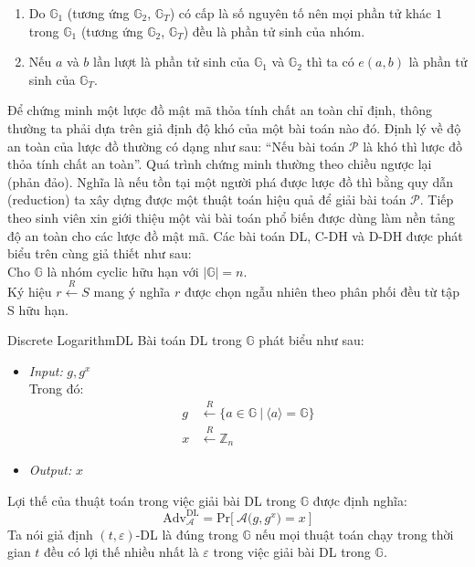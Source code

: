 \documentclass[class=report, crop=false]{standalone}
\begin{document}
		\begin{remark}
			\leavevmode \vspace{-\baselineskip}
			\begin{enumerate}[label=(\roman*), leftmargin=1cm]
				\item Do $\mathbb{G}_1$ (tương ứng $\mathbb{G}_2$, $\mathbb{G}_T$) có cấp là số nguyên tố nên mọi phần tử khác $1$ trong $\mathbb{G}_1$ (tương ứng $\mathbb{G}_2$, $\mathbb{G}_T$) đều là phần tử sinh của nhóm.
				\item Nếu $a$ và $b$ lần lượt là phần tử sinh của $\mathbb{G}_1$ và $\mathbb{G}_2$ thì ta có $e(a, b)$ là phần tử sinh của $\mathbb{G}_T$.
			\end{enumerate}
		\end{remark}
		Để chứng minh một lược đồ mật mã thỏa tính chất an toàn chỉ định, thông thường ta phải dựa trên giả định độ khó của một bài toán nào đó. Định lý về độ an toàn của lược đồ thường có dạng như sau: ``Nếu bài toán $\mathcal{P}$ là khó thì lược đồ thỏa tính chất an toàn''. Quá trình chứng minh thường theo chiều ngược lại (phản đảo). Nghĩa là nếu tồn tại một người phá được lược đồ thì bằng quy dẫn (reduction) ta xây dựng được một thuật toán hiệu quả để giải bài toán $\mathcal{P}$.
		\newpage
		Tiếp theo sinh viên xin giới thiệu một vài bài toán phổ biến được dùng làm nền tảng độ an toàn cho các lược đồ mật mã. Các bài toán DL, C-DH và D-DH được phát biểu trên cùng giả thiết như sau: \\ \indent
		Cho $\mathbb{G}$ là nhóm cyclic hữu hạn với $|\mathbb{G}| = n$. \\ \indent
		Ký hiệu \hspace{1ex} $r \xleftarrow{R} S$ \hspace{1ex} mang ý nghĩa $r$ được chọn ngẫu nhiên theo phân phối đều từ tập S hữu hạn.
		\begin{problem}{Discrete Logarithm}{DL}
			Bài toán DL trong $\mathbb{G}$ phát biểu như sau:
			\vspace{-\baselineskip}
			\begin{itemize}[leftmargin=1.5cm, itemindent=-0.5cm]
				\item[] \textit{Input:} $g, g^x$ \\
				Trong đó: \vspace{-\baselineskip}
				\begin{align*}
					g &\xleftarrow{R} \{ a \in \mathbb{G}\ | \ \langle a \rangle = \mathbb{G} \} \\
					x &\xleftarrow{R} \mathbb{Z}_n
				\end{align*}
				\item[] \textit{Output:} $x$
			\end{itemize}
			\vspace{-\baselineskip}\par
			Lợi thế của thuật toán \algo trong việc giải bài DL trong $\mathbb{G}$ được định nghĩa:
			\[
				\text{Adv}_{\mathcal{A}}^{\text{DL}} = \text{Pr}\bigg[ \ \mathcal{A}\Big(g, g^x \Big) = x \ \bigg]
			\] \indent
			Ta nói giả định $(t, \varepsilon)$-DL là đúng trong $\mathbb{G}$ nếu mọi thuật toán chạy trong thời gian $t$ đều có lợi thế nhiều nhất là $\varepsilon$ trong việc giải bài DL trong $\mathbb{G}$.
		\end{problem}
\end{document}
